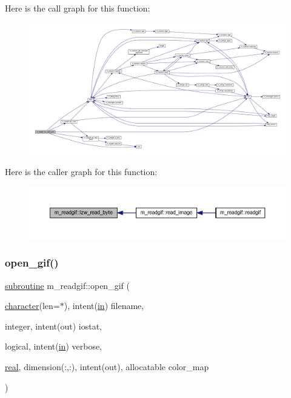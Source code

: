 Here is the call graph for this function\+:
\nopagebreak
\begin{figure}[H]
\begin{center}
\leavevmode
\includegraphics[width=350pt]{namespacem__readgif_a314e657d0662360266bac5702a657ef1_cgraph}
\end{center}
\end{figure}
Here is the caller graph for this function\+:
\nopagebreak
\begin{figure}[H]
\begin{center}
\leavevmode
\includegraphics[width=350pt]{namespacem__readgif_a314e657d0662360266bac5702a657ef1_icgraph}
\end{center}
\end{figure}
\mbox{\label{namespacem__readgif_ae008e851af60f4d8fdeeb4fd96b8580d}} 
\subsubsection{\texorpdfstring{open\+\_\+gif()}{open\_gif()}}
{\footnotesize\ttfamily \hyperlink{M__stopwatch_83_8txt_acfbcff50169d691ff02d4a123ed70482}{subroutine} m\+\_\+readgif\+::open\+\_\+gif (\begin{DoxyParamCaption}\item[{\hyperlink{option__stopwatch_83_8txt_abd4b21fbbd175834027b5224bfe97e66}{character}(len=$\ast$), intent(\hyperlink{M__journal_83_8txt_afce72651d1eed785a2132bee863b2f38}{in})}]{filename,  }\item[{integer, intent(out)}]{iostat,  }\item[{logical, intent(\hyperlink{M__journal_83_8txt_afce72651d1eed785a2132bee863b2f38}{in})}]{verbose,  }\item[{\hyperlink{read__watch_83_8txt_abdb62bde002f38ef75f810d3a905a823}{real}, dimension(\+:,\+:), intent(out), allocatable}]{color\+\_\+map }\end{DoxyParamCaption})\hspace{0.3cm}{\ttfamily [private]}}



